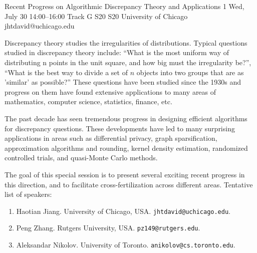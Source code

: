 \begin{talk}
  {Recent Progress on Algorithmic Discrepancy Theory and Applications}%
  {1}%
  {}%
  {}%
  {}%
  {}%
  {Wed, July 30 14:00–16:00 Track G}%
  {S20}%
  {S20}%
  {%
    {University of Chicago}%
    {jhtdavid@uchicago.edu}}%


Discrepancy theory studies the irregularities of distributions. Typical questions studied in discrepancy theory include: ``What is the most uniform way of distributing n points in the unit square, and how big must the irregularity be?'', ``What is the best way to divide a set of $n$ objects into two groups that are as 'similar' as possible?'' These questions have been studied since the 1930s and progress on them have found extensive applications to many areas of mathematics, computer science, statistics, finance, etc. 

The past decade has seen tremendous progress in designing efficient algorithms for discrepancy questions. These developments have led to many surprising applications in areas such as differential privacy, graph sparsification, approximation algorithms and rounding, kernel density estimation, randomized controlled trials, and quasi-Monte Carlo methods. 

The goal of this special session is to present several exciting recent progress in this direction, and to facilitate cross-fertilization across different areas. Tentative list of speakers:  
\begin{enumerate}
    \item Haotian Jiang. University of Chicago, USA. \texttt{jhtdavid@uchicago.edu}. 
    \item Peng Zhang. Rutgers University, USA. \texttt{pz149@rutgers.edu}. 
    \item Aleksandar Nikolov. University of Toronto. \texttt{anikolov@cs.toronto.edu}.
\end{enumerate}


\end{talk}
